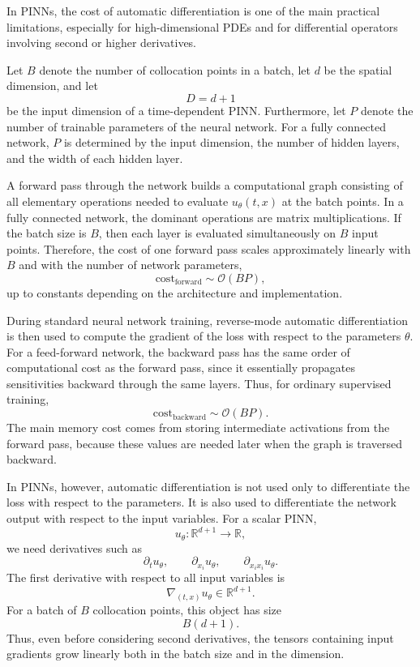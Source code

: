 



In PINNs, the cost of automatic differentiation is one of the main practical limitations, especially for high-dimensional PDEs and for differential operators involving second or higher derivatives.

Let $B$ denote the number of collocation points in a batch, let $d$ be the spatial dimension, and let
\[
    D = d+1
\]
be the input dimension of a time-dependent PINN. Furthermore, let $P$ denote the number of trainable parameters of the neural network. For a fully connected network, $P$ is determined by the input dimension, the number of hidden layers, and the width of each hidden layer.

A forward pass through the network builds a computational graph consisting of all elementary operations needed to evaluate $u_\theta(t,x)$ at the batch points. In a fully connected network, the dominant operations are matrix multiplications. If the batch size is $B$, then each layer is evaluated simultaneously on $B$ input points. Therefore, the cost of one forward pass scales approximately linearly with $B$ and with the number of network parameters,
\[
    \mathrm{cost}_{\mathrm{forward}}
    \sim
    \mathcal{O}(BP),
\]
up to constants depending on the architecture and implementation.

During standard neural network training, reverse-mode automatic differentiation is then used to compute the gradient of the loss with respect to the parameters $\theta$. For a feed-forward network, the backward pass has the same order of computational cost as the forward pass, since it essentially propagates sensitivities backward through the same layers. Thus, for ordinary supervised training,
\[
    \mathrm{cost}_{\mathrm{backward}}
    \sim
    \mathcal{O}(BP).
\]
The main memory cost comes from storing intermediate activations from the forward pass, because these values are needed later when the graph is traversed backward.

In PINNs, however, automatic differentiation is not used only to differentiate the loss with respect to the parameters. It is also used to differentiate the network output with respect to the input variables. For a scalar PINN,
\[
    u_\theta : \mathbb{R}^{d+1} \to \mathbb{R},
\]
we need derivatives such as
\[
    \partial_t u_\theta,
    \qquad
    \partial_{x_i} u_\theta,
    \qquad
    \partial_{x_i x_i} u_\theta.
\]
The first derivative with respect to all input variables is
\[
    \nabla_{(t,x)} u_\theta
    \in \mathbb{R}^{d+1}.
\]
For a batch of $B$ collocation points, this object has size
\[
    B(d+1).
\]
Thus, even before considering second derivatives, the tensors containing input gradients grow linearly both in the batch size and in the dimension.

